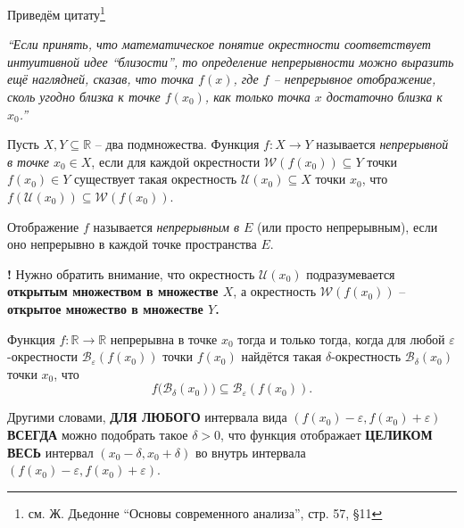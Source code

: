 Приведём цитату\footnote{см. Ж. Дьедонне ``Основы современного анализа'', стр. 57, \S11}

\textit{``Если принять, что математическое понятие окрестности соответствует интуитивной идее ``близости'', то определение непрерывности можно выразить ещё наглядней, сказав, что точка $f(x)$, где $f$ -- непрерывное отображение, сколь угодно близка к точке $f(x_0)$, как только точка $x$ достаточно близка к $x_0$.''}


\begin{definition}\label{def_of_cont_on_sets_on_R}
 Пусть $X,Y \subseteq \mathbb{R}$ -- два подмножества. Функция $f: X  \to Y$ называется \textit{непрерывной в точке $x_0 \in X$}, если для каждой окрестности $\mathscr{W}(f(x_0)) \subseteq Y$ точки $f(x_0) \in Y$ существует такая окрестность $\mathscr{U}(x_0)\subseteq X$ точки $x_0$, что $f(\mathscr{U}(x_0)) \subseteq \mathscr{W}(f(x_0))$.
 
 Отображение $f$ называется \textit{непрерывным в $E$} (или просто непрерывным), если оно непрерывно в каждой точке пространства $E.$
\end{definition}

\begin{mydangerr}{\bf !}
Нужно обратить внимание, что окрестность $\mathscr{U}(x_0)$ подразумевается \textbf{открытым множеством в множестве $X$}, а окрестность $\mathscr{W}(f(x_0))$ -- \textbf{открытое множество в множестве $Y$.}
\end{mydangerr}

\begin{lemma}\label{contious_on_R}
 Функция $f:\mathbb{R} \to \mathbb{R}$ непрерывна в точке $x_0$ тогда и только тогда, когда для любой $\varepsilon$-окрестности $\mathscr{B}_\varepsilon(f(x_0))$ точки $f(x_0)$ найдётся такая $\delta$-окрестность $\mathscr{B}_\delta(x_0)$ точки $x_0$, что 
 \[
 f\bigl(\mathscr{B}_\delta(x_0) \bigr) \subseteq \mathscr{B}_\varepsilon(f(x_0)).
 \]
\end{lemma}

\begin{comments}
Другими словами, \textbf{ДЛЯ ЛЮБОГО} интервала вида $(f(x_0)-\varepsilon, f(x_0) + \varepsilon)$ \textbf{ВСЕГДА} можно подобрать такое $\delta>0$, что функция отображает \textbf{ЦЕЛИКОМ ВЕСЬ} интервал $(x_0- \delta, x_0 + \delta)$ во внутрь интервала  $(f(x_0)-\varepsilon, f(x_0) + \varepsilon)$.
\end{comments}


